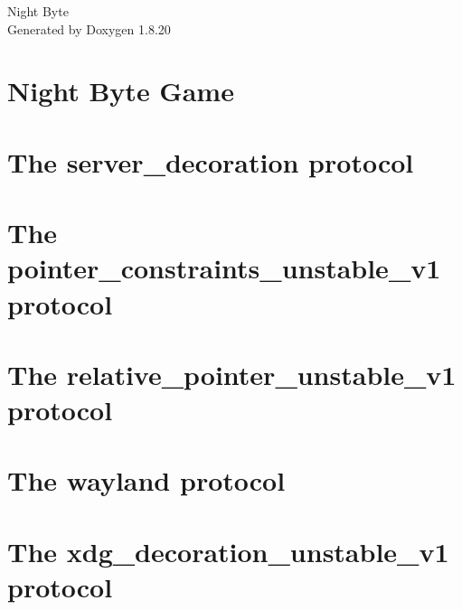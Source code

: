\let\mypdfximage\pdfximage\def\pdfximage{\immediate\mypdfximage}\documentclass[twoside]{book}
\newcommand{\+}{\discretionary{\mbox{\scriptsize$\hookleftarrow$}}{}{}}
\newcommand{\clearemptydoublepage}{%
  \newpage{\pagestyle{empty}\cleardoublepage}%
}
\begin{document}
\hypersetup{pageanchor=false,
             bookmarksnumbered=true,
             pdfencoding=unicode
            }
\begin{titlepage}
\vspace*{7cm}
\begin{center}%
{\Large Night Byte }\\
\vspace*{1cm}
{\large Generated by Doxygen 1.8.20}\\
\end{center}
\end{titlepage}
\clearemptydoublepage
{}
\tableofcontents
\clearemptydoublepage
{}
\hypersetup{pageanchor=true}

\chapter{Night Byte Game}
\label{index}\hypertarget{index}{}
\chapter{The server\+\_\+decoration protocol}
\label{page_server_decoration}

\chapter{The pointer\+\_\+constraints\+\_\+unstable\+\_\+v1 protocol}
\label{page_pointer_constraints_unstable_v1}

\chapter{The relative\+\_\+pointer\+\_\+unstable\+\_\+v1 protocol}
\label{page_relative_pointer_unstable_v1}

\chapter{The wayland protocol}
\label{page_wayland}

\chapter{The xdg\+\_\+decoration\+\_\+unstable\+\_\+v1 protocol}
\label{page_xdg_decoration_unstable_v1}

\end{document}
